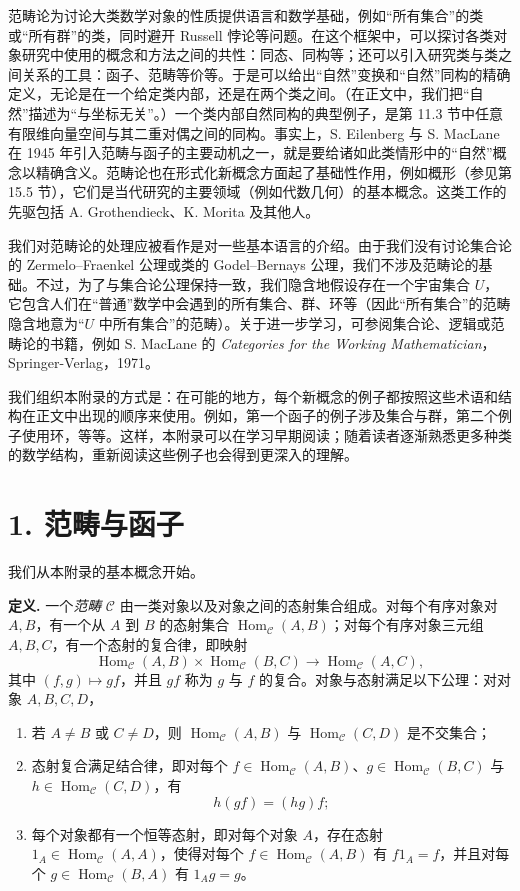 范畴论为讨论大类数学对象的性质提供语言和数学基础，例如“所有集合”的类或“所有群”的类，同时避开 Russell 悖论等问题。在这个框架中，可以探讨各类对象研究中使用的概念和方法之间的共性：同态、同构等；还可以引入研究类与类之间关系的工具：函子、范畴等价等。于是可以给出“自然”变换和“自然”同构的精确定义，无论是在一个给定类内部，还是在两个类之间。（在正文中，我们把“自然”描述为“与坐标无关”。）一个类内部自然同构的典型例子，是第 11.3 节中任意有限维向量空间与其二重对偶之间的同构。事实上，S. Eilenberg 与 S. MacLane 在 1945 年引入范畴与函子的主要动机之一，就是要给诸如此类情形中的“自然”概念以精确含义。范畴论也在形式化新概念方面起了基础性作用，例如概形（参见第 15.5 节），它们是当代研究的主要领域（例如代数几何）的基本概念。这类工作的先驱包括 A. Grothendieck、K. Morita 及其他人。

我们对范畴论的处理应被看作是对一些基本语言的介绍。由于我们没有讨论集合论的 Zermelo--Fraenkel 公理或类的 Godel--Bernays 公理，我们不涉及范畴论的基础。不过，为了与集合论公理保持一致，我们隐含地假设存在一个宇宙集合 $U$，它包含人们在“普通”数学中会遇到的所有集合、群、环等（因此“所有集合”的范畴隐含地意为“$U$ 中所有集合”的范畴）。关于进一步学习，可参阅集合论、逻辑或范畴论的书籍，例如 S. MacLane 的 \emph{Categories for the Working Mathematician}，Springer-Verlag，1971。

我们组织本附录的方式是：在可能的地方，每个新概念的例子都按照这些术语和结构在正文中出现的顺序来使用。例如，第一个函子的例子涉及集合与群，第二个例子使用环，等等。这样，本附录可以在学习早期阅读；随着读者逐渐熟悉更多种类的数学结构，重新阅读这些例子也会得到更深入的理解。

\section*{1. 范畴与函子}

我们从本附录的基本概念开始。

\noindent\textbf{定义.} 一个\emph{范畴} $\mathcal C$ 由一类对象以及对象之间的态射集合组成。对每个有序对象对 $A,B$，有一个从 $A$ 到 $B$ 的态射集合 $\operatorname{Hom}_{\mathcal C}(A,B)$；对每个有序对象三元组 $A,B,C$，有一个态射的复合律，即映射
\[
  \operatorname{Hom}_{\mathcal C}(A,B)\times\operatorname{Hom}_{\mathcal C}(B,C)
  \longrightarrow \operatorname{Hom}_{\mathcal C}(A,C),
\]
其中 $(f,g)\mapsto gf$，并且 $gf$ 称为 $g$ 与 $f$ 的复合。对象与态射满足以下公理：对对象 $A,B,C,D$，
\begin{enumerate}[label=(\roman*)]
  \item 若 $A\neq B$ 或 $C\neq D$，则 $\operatorname{Hom}_{\mathcal C}(A,B)$ 与 $\operatorname{Hom}_{\mathcal C}(C,D)$ 是不交集合；
  \item 态射复合满足结合律，即对每个 $f\in\operatorname{Hom}_{\mathcal C}(A,B)$、$g\in\operatorname{Hom}_{\mathcal C}(B,C)$ 与 $h\in\operatorname{Hom}_{\mathcal C}(C,D)$，有
  \[
    h(gf)=(hg)f;
  \]
  \item 每个对象都有一个恒等态射，即对每个对象 $A$，存在态射 $1_A\in\operatorname{Hom}_{\mathcal C}(A,A)$，使得对每个 $f\in\operatorname{Hom}_{\mathcal C}(A,B)$ 有 $f1_A=f$，并且对每个 $g\in\operatorname{Hom}_{\mathcal C}(B,A)$ 有 $1_Ag=g$。
\end{enumerate}

